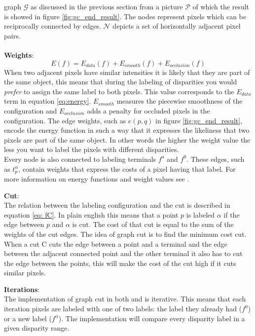 \documentclass[a4paper]{article}
\begin{document}
graph $\mathcal{G}$ as discussed in the previous section from a
picture $\mathcal{P}$ of which the result is showed in figure \ref{fig:gc_end_result}.
The nodes represent pixels which can be reciprocally connected by edges.  $\mathcal{N}$ depicts a set of horizontally
adjacent pixel pairs.\\\\
\noindent\textbf{Weights}:\indent\\
\begin{equation}
 E(f) = E_{data}(f) + E_{smooth}(f) + E_{occlusion}(f)
\label{eq:energy}
\end{equation}
When two adjacent pixels have similar intensities it is likely that
they are part of the same object, this means that during the labeling
of disparities you would \emph{prefer} to assign the same label to
both pixels. This value corresponds to the $E_{data}$ term in equation \ref{eq:energy}.
$E_{smooth}$ measures the piecewise smoothness of the configuration and $E_{occlusion}$ 
adds a penalty for occluded pixels in the configuration.
The edge weights, such as $e(p,q)$ in figure \ref{fig:gc_end_result}, encode the energy function in such a way that it expresses
the likeliness that two pixels are part of the same object. In other words the higher the weight value 
the less you want to label the pixels with different disparities.\\
Every node is also connected to labeling terminals $f^a$ and $f^0$. These edges, such as $t^{\alpha}_{p}$, contain weights that 
express the costs of a pixel having that label. For more information on energy functions and weight values see \cite{zabih2001}.

\noindent\textbf{Cut}:\indent\\
The relation between the labeling configuration and the cut is described in equation \ref{eq: fC}. In plain english 
this means that a point $p$ is labeled $\alpha$ if the edge between $p$ and $\alpha$ is cut. The cost of that cut is equal 
to the sum of the weights of the cut edges. The idea of graph cut is to find the minimum cost cut. When a cut C cuts the 
edge between a point and a terminal and the edge between the adjacent connected point and the other terminal it also has to
cut the edge between the points, this will make the cost of the cut high if it cuts similar pixels.

\noindent\textbf{Iterations}:\indent\\
The implementation of graph cut in both \cite{zabih2001} and \cite{kolmogorov2003} is iterative. This means that each iteration 
pixels are labeled with one of two labels: the label they already had ($f^0$) or a new label ($f^{\alpha}$). The implementation 
will compare every disparity label in a given disparity range.\\\\
\end{document}
